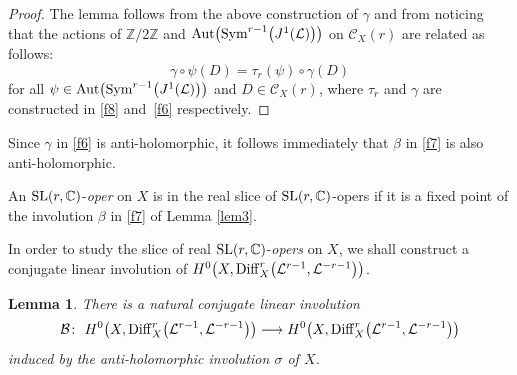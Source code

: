 \documentclass[10pt,a4paper]{amsart}
\numberwithin{equation}{section}
\newtheorem{Lemma}[Theorem]{Lemma}
\begin{document}
\begin{proof}
The lemma follows from the above construction of $\gamma$ and from noticing that the
actions of ${\mathbb Z}/2{\mathbb Z}$ and ${\rm Aut}\bigl({\rm Sym}^{r-1}\bigl(J^1(\mathcal L)\bigr)\bigr)$
on ${\mathcal C}_X(r)$ are related as follows:
\[
\gamma\circ\psi (D) = \tau_r(\psi)\circ\gamma(D)
\]
for all $\psi \in {\rm Aut}\bigl({\rm Sym}^{r-1}\bigl(J^1(\mathcal L)\bigr)\bigr)$ and $D \in {\mathcal C}_X(r)$, where $\tau_r$
and $\gamma$ are constructed in \eqref{f8} and~\eqref{f6} respectively.
\end{proof}

\begin{Remark} Since $\gamma$ in \eqref{f6} is anti-holomorphic, it
follows immediately that $\beta$ in \eqref{f7} is also anti-holomorphic.
\end{Remark}

\begin{Definition}\label{de1}
An ${\rm SL}(r,{\mathbb C})$-{\it oper} on $X$ is in the real slice of ${\rm SL}(r,\mathbb{C})$-opers if it is a fixed point of the
involution $\beta$ in \eqref{f7} of Lemma \ref{lem3}.
\end{Definition}

In order to study the slice of real ${\rm SL}(r,{\mathbb C})$-{\it opers} on $X$, we shall construct a conjugate linear involution of $H^0\bigl(X, {\rm Diff}^r_X\bigl({\mathcal L}^{r-1},
{\mathcal L}^{-r-1}\bigr)\bigr)$.

\begin{Lemma}\label{bigb} There is a natural
conjugate linear involution \begin{equation}\label{f9}
{\mathcal B} \colon\ H^0\bigl(X, {\rm Diff}^r_X\bigl({\mathcal L}^{r-1}, {\mathcal L}^{-r-1}\bigr)\bigr) \longrightarrow
H^0\bigl(X, {\rm Diff}^r_X\bigl({\mathcal L}^{r-1}, {\mathcal L}^{-r-1}\bigr)\bigr)
\end{equation}
induced by the anti-holomorphic involution $\sigma$ of $X$.
\end{Lemma}
\end{document}
